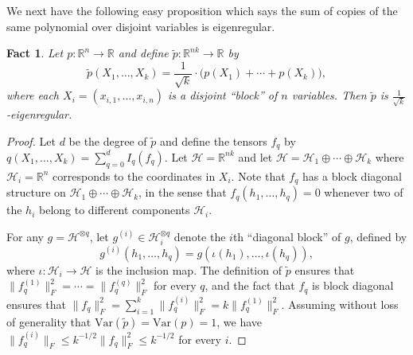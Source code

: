 \documentclass[11pt]{article}
\numberwithin{equation}{section}
\newtheorem{fact}[theorem]{Fact}
\theoremstyle{definition}
\theoremstyle{plain}
\newcommand{\Var}{\mathrm{Var}}
\begin{document}
We next have the following easy proposition which says the sum of copies of the same polynomial over disjoint variables is eigenregular. 
\begin{fact}\label{fact:eigen-2}
Let $p: \mathbb{R}^{n} \rightarrow \mathbb{R}$ and define $\tilde p : \mathbb{R}^{n k} \rightarrow \mathbb{R}$ by
$$
\tilde p(X_1, \ldots, X_k) = \frac{1}{\sqrt{k}} \cdot \big( p(X_1) + \cdots + p(X_k)), 
$$
where each $X_i = (x_{i,1}, \dots, x_{i,n})$ is a disjoint ``block'' of $n$ variables. Then $\tilde p$ is $\frac{1}{\sqrt{k}}$-eigenregular. 
\end{fact}
\begin{proof}
Let $d$ be the degree of $\tilde p$ and define the tensors $f_q$ by $q(X_1, \ldots, X_k) =  \sum_{q=0}^{d}I_q(f_q)$.
Let $\mathcal{H} = \mathbb{R}^{n k}$ and let $\mathcal{H} = \mathcal{H}_1
\oplus \cdots \oplus \mathcal{H}_k$ where $\mathcal{H}_i = \mathbb{R}^n$
corresponds to the coordinates in $X_i$. Note that $f_q$ has a block diagonal
structure on $\mathcal{H}_1 \oplus \cdots \oplus \mathcal{H}_k$, in the sense that
$f_q(h_1, \dots, h_q) = 0$ whenever two of the $h_i$ belong to different components $\mathcal{H}_i$.

For any $g = \mathcal{H}^{\otimes q}$, let $g^{(i)} \in \mathcal{H}_i^{\otimes q}$ denote the $i$th ``diagonal block''
of $g$, defined by
\[
    g^{(i)}(h_1, \dots, h_q) = g(\iota(h_1), \dots, \iota(h_q)),
\]
where $\iota: \mathcal{H}_i \to \mathcal{H}$ is the inclusion map.
The definition of $\tilde p$ ensures that $\|f_q^{(1)}\|_F^2 = \cdots = \|f_q^{(q)}\|_F^2$
for every $q$, and the fact that $f_q$ is block diagonal ensures that
$\|f_q\|_F^2 = \sum_{i=1}^k \|f_q^{(i)}\|_F^2 = k \|f_q^{(1)}\|_F^2$.
Assuming without loss of generality that $\Var(\tilde p) = \Var(p) = 1$,
we have $\|f_q^{(i)}\|_F \le k^{-1/2} \|f_q\|_F^2 \le k^{-1/2}$ for every $i$.



\end{proof}
\end{document}
